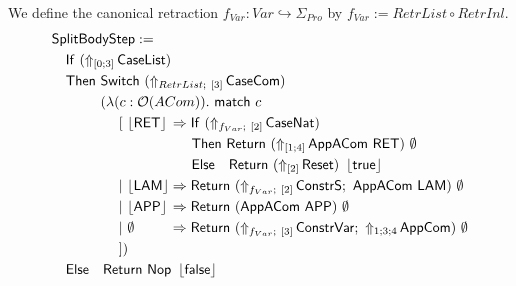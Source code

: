 \begin{definition}
  \label{def:JumpTarget}
  We define the canonical retraction $f_{Var} : Var \hookrightarrow \Sigma_{Pro}$ by $f_{Var} := RetrList \circ RetrInl$.
  \begin{alignat*}{1}
    & \MS{SplitBodyStep} := \\
    & \quad \MS{If}~(\LiftTapes{\MS{CaseList}}{\Vector{0;3}}) \\
    & \quad \MS{Then}~\Switch~(\LiftBoth{\MS{CaseCom}}{RetrList}{\Vector{3}}) \\
    & \quad \phantom{\MS{Then}}~(\lambda (c : \Option(ACom)).~\MS{match}~c\\
    & \quad \phantom{\MS{Then}~(\lambda}~[~ \phalign{\Some{\MS{LAM}}}{\Some{\MS{RET}}} \Rightarrow \MS{If}~(\LiftBoth{\MS{CaseNat}}{f_{Var}}{\Vector{2}}) \\
    & \quad \phantom{\MS{Then}~(\lambda~[~ \Some{\MS{LAM} \Rightarrow}}~\MS{Then}~ \Return{(\LiftTapes{\MS{AppACom~\MS{RET}}}{\Vector{1;4}})}{\None} \\
    & \quad \phantom{\MS{Then}~(\lambda~[~ \Some{\MS{LAM} \Rightarrow}}~\MS{Else}~~~ \Return{(\LiftTapes{\MS{Reset}}{\Vector{2}})}{\Some\true} \\
    & \quad \phantom{\MS{Then}~(\lambda}~|~ \phalign{\Some{\MS{LAM}}}{\Some{\MS{LAM}}} \Rightarrow \Return{(\LiftBoth{\MS{ConstrS}}{f_{Var}}{\Vector{2}} \Seq \MS{AppACom}~\MS{LAM})}{\None} \\
    & \quad \phantom{\MS{Then}~(\lambda}~|~ \phalign{\Some{\MS{LAM}}}{\Some{\MS{APP}}} \Rightarrow \Return{(\MS{AppACom}~\MS{APP})}{\None} \\
    & \quad \phantom{\MS{Then}~(\lambda}~|~ \phalign{\Some{\MS{LAM}}}{\None} \Rightarrow \Return{(\LiftBoth{\MS{ConstrVar}}{f_{Var}}{\Vector{3}} \Seq \LiftTapes{\MS{AppCom}}{1;3;4})}{\None} \\
    & \quad \phantom{\MS{Then}~(\lambda}~]) \\
    & \quad \MS{Else}~~~ \Return{\Nop}{\Some\false}
  \end{alignat*}
\end{definition}

